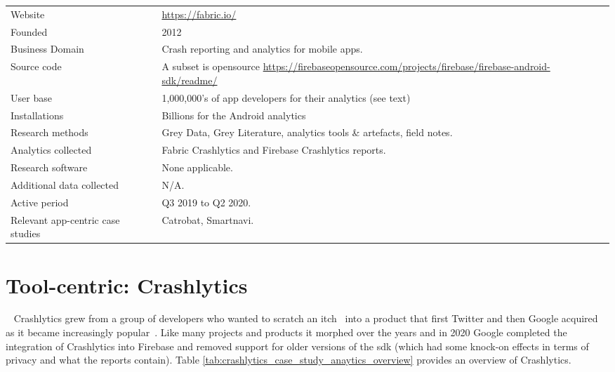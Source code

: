 \begin{table*}[htbp!]
    \centering
    \small
    \renewcommand{\arraystretch}{0.8}%
    \setlength{\tabcolsep}{6pt}
    \begin{tabular}{lp{9cm}}
       \toprule
       Website &\url{https://fabric.io/} \\
       Founded & 2012 \\
       Business Domain & Crash reporting and analytics for mobile apps. \\
       Source code  & A subset is opensource \url{https://firebaseopensource.com/projects/firebase/firebase-android-sdk/readme/} \\
       \midrule
       User base & 1,000,000's of app developers for their analytics (see text) \\ %
       Installations & Billions for the Android analytics \\ %
       \midrule
       Research methods &Grey Data, Grey Literature, analytics tools \& artefacts, field notes. \\
       Analytics collected &Fabric Crashlytics and Firebase Crashlytics reports. \\
       Research software & None applicable. \\
       Additional data collected &N/A. \\
       Active period & Q3 2019 to Q2 2020. \\
       Relevant app-centric case studies & Catrobat, Smartnavi. \\
       \bottomrule
    \end{tabular}
    \caption{Tool Centric Case Study key facts: Crashlytics}
    \label{tab:crashlytics_case_study_anaytics_overview}
\end{table*}

\section{Tool-centric: Crashlytics}~\label{case-study-overview-crashlytics}
Crashlytics grew from a group of developers who wanted to scratch an itch~ into a product that first Twitter and then Google acquired as it became increasingly popular~. 
Like many projects and products it morphed over the years and in 2020 Google completed the integration of Crashlytics into Firebase and removed support for older versions of the \Gls{sdk} (which had some knock-on effects in terms of privacy and what the reports contain). Table \ref{tab:crashlytics_case_study_anaytics_overview} provides an overview of Crashlytics.

